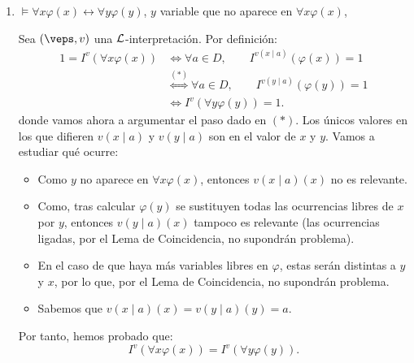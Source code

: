 \begin{ejercicio}
\begin{enumerate}
\begin{itemize}
            De nuevo, se da $I^v(\exists x \psi \vee \exists x \varphi) = I^v(\exists x(\psi \vee \varphi))$.
        \end{itemize}

        En cualquier caso, hemos probado que:
        \begin{equation*}
            I^v(\exists x \psi \vee \exists x \varphi) = I^v(\exists x(\psi \vee \varphi)).
        \end{equation*}

        Por tanto:
        \begin{align*}
            I( \exists x \psi \vee \exists x \varphi \leftrightarrow \exists x(\psi \vee \varphi))
            &= 1+I(\exists x \psi \vee \exists x \varphi)+I(\exists x(\psi \vee \varphi))=1
        \end{align*}


        \item $\models \forall x \varphi(x) \leftrightarrow \forall y \varphi(y)$, $y$ variable que no aparece en $\forall x \varphi(x)$,
        
        Sea $(\veps,v)$ una $\mathcal{L}$-interpretación. Por definición:
        \begin{align*}
            1 = I^v(\forall x \varphi(x))
            &\iff \forall a\in D,\qquad I^{v(x\mid a)}(\varphi(x)) = 1\\
            &\stackrel{(\ast)}{\iff} \forall a\in D,\qquad I^{v(y\mid a)}(\varphi(y)) = 1\\
            &\iff I^v(\forall y \varphi(y)) = 1.
        \end{align*}
        donde vamos ahora a argumentar el paso dado en $(\ast)$. Los únicos valores en los que difieren $v(x\mid a)$ y $v(y\mid a)$ son en el valor de $x$ y $y$. Vamos a estudiar qué ocurre:
        \begin{itemize}
            \item Como $y$ no aparece en $\forall x \varphi(x)$, entonces $v(x\mid a)(x)$ no es relevante.
            \item Como, tras calcular $\varphi(y)$ se sustituyen todas las ocurrencias libres de $x$ por $y$, entonces $v(y\mid a)(x)$ tampoco es relevante (las ocurrencias ligadas, por el Lema de Coincidencia, no supondrán problema).
            \item En el caso de que haya más variables libres en $\varphi$, estas serán distintas a $y$ y $x$, por lo que, por el Lema de Coincidencia, no supondrán problema.
            \item Sabemos que $v(x\mid a)(x) = v(y\mid a)(y)=a$.
        \end{itemize}
        Por tanto, hemos probado que:
        \begin{equation*}
            I^v(\forall x \varphi(x)) = I^v(\forall y \varphi(y)).
        \end{equation*}


\end{enumerate}
\end{ejercicio}
